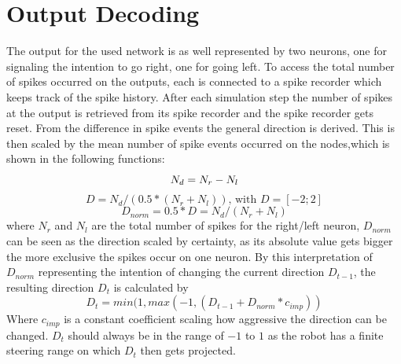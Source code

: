 \section{Output Decoding}\label{sec:OutputDecoding}
The output for the used network is as well represented by two neurons, one for signaling the intention to go right, one for going left. To access the total number of spikes occurred on the outputs, each is connected to a spike recorder which keeps track of the spike history.
After each simulation step the number of spikes at the output is retrieved from its spike recorder and the spike recorder gets reset. From the difference in spike events the general direction is derived. This is then scaled by the mean number of spike events occurred on the nodes,which is shown in the following functions:
\begin{equation}
  N_d = N_r - N_l \\
\end{equation}
\begin{equation}
  D = N_d / (0.5 * (N_r + N_l)) \text{, with $D=[-2;2]$} 
\end{equation}
\begin{equation}
  D_{norm} = 0.5 * D = N_d/(N_r+N_l) 
\end{equation}
where $N_r$ and $N_l$ are the total number of spikes for the right/left neuron, $D_{norm}$ can be seen as the direction scaled by certainty, as its absolute value gets bigger the more exclusive the spikes occur on one neuron. By this interpretation of $D_{norm}$ representing the intention of changing the current direction $D_{t-1}$, the resulting direction $D_t$ is calculated by 
\label{eg:OutputCalc}
\begin{equation}
  D_t = min(1,max(-1,( D_{t-1} + D_{norm} * c_{imp}))
\end{equation}
Where $c_{imp}$ is a constant coefficient scaling how aggressive the direction can be changed. $D_t$ should always be in the range of $-1$ to $1$ as the robot has a finite steering range on which $D_t$ then gets projected.


